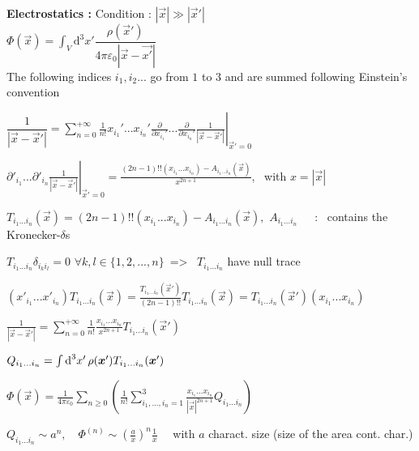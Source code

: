 \begin{squishlist}
\item \textbf{Electrostatics :} Condition : $|\vec{x}| \gg |\vec{x}'|$
\\

$\Phi(\vec{x}) = \displaystyle{\int_V} \text{d}^3 x' \dfrac{\rho(\vec{x}')}{4\pi\varepsilon_0|\vec{x}-\vec{x'}|}$ \\
The following indices $i_1,i_2...$ go from $1$ to $3$ and are summed following Einstein's convention

\item  $\dfrac{1}{|\vec{x} - \vec{x}'|} = \left. \sum_{n=0}^{+\infty} \frac{1}{n!} x_{i_1}'...x_{i_n}' \frac{\partial}{\partial x_{i_1}'}... \frac{\partial}{\partial x_{i_n}'} \frac{1}{|\vec{x} - \vec{x}'|} \right|_{\vec{x}' = 0}$

\item $\left. \partial'_{i_1}...\partial'_{i_n} \frac{1}{|\vec{x} - \vec{x}'|}\right|_{\vec{x}' = 0} = \frac{(2n-1)!! (x_{i_1}...x_{i_n}) - A_{i_1 ... i_n} (\vec{x})}{x^{2n+1}}$, \, with $x=|\vec{x}|$

\item $T_{i_1 ... i_n}(\vec{x}) = (2n-1)!! (x_{i_1} ... x_{i_n}) - A_{i_1 ... i_n} (\vec{x}), \, \,  A_{i_1...i_n} \, \quad $ : \, contains the Kronecker-$\delta$s

\item $T_{i_1...i_n} \delta_{i_k i_l} = 0 \,\, \forall k,l \in \{1,2,...,n\} \, $ => \, $T_{i_1...i_n}$ have null trace

\item $(x'_{i_1}...x'_{i_n}) T_{i_1 ... i_n}(\vec{x}) = \frac{T_{i_1 ... i_n}(\vec{x}')}{(2n-1)!!} T_{i_1 ... i_n}(\vec{x}) = T_{i_1...i_n}(\vec{x}') (x_{i_1}...x_{i_n})$

\item $\frac{1}{|\vec{x} - \vec{x}'|} = \sum_{n=0}^{+\infty} \frac{1}{n!} \frac{x_{i_1}...x_{i_n}}{x^{2n+1}} T_{i_1...i_n}(\vec{x}')$

\item $Q_{i_1...i_n} = \int \textrm{d} ^3x' \, \rho(\mbox{\boldmath$x$}') T_{i_1...i_n}(\mbox{\boldmath$x$}')$

\item $ \Phi(\vec{x}) = \frac{1}{4\pi\varepsilon_0}\sum_{n\geq0}\left(\frac{1}{n!}\sum_{i_1,...,i_n = 1}^{3}\frac{x_{i_1}...x_{i_n}}{|\vec{x}|^{2n+1}}Q_{i_1...i_n}\right)$

\item $Q_{i_1...i_n} \sim a^n , \quad \Phi^{(n)} \sim \left(\frac{a}{x}\right)^n \frac{1}{x} \quad$ with $a$ charact. size (size of the area cont. char.)


\end{squishlist}
